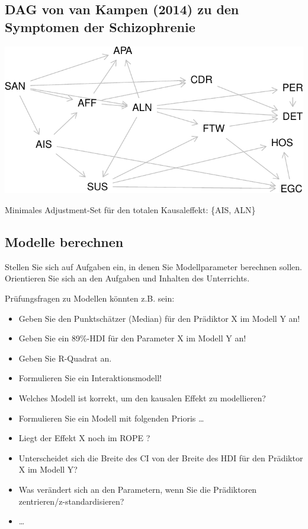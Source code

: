 \documentclass[
  a4paper,
  DIV=11]{scrreprt}
\providecommand{\tightlist}{%
  \setlength{\itemsep}{0pt}\setlength{\parskip}{0pt}}\usepackage{longtable,booktabs,array}
\theoremstyle{definition}
\theoremstyle{remark}
\begin{document}
\hypertarget{dag-von-van-kampen-2014-zu-den-symptomen-der-schizophrenie}{%
\subsection{DAG von van Kampen (2014) zu den Symptomen der
Schizophrenie}\label{dag-von-van-kampen-2014-zu-den-symptomen-der-schizophrenie}}

\includegraphics{./abschluss_files/figure-pdf/dag-van-kampen-1.pdf}

Minimales Adjustment-Set für den totalen Kausaleffekt: \{AIS, ALN\}

\hypertarget{modelle-berechnen}{%
\subsection{Modelle berechnen}\label{modelle-berechnen}}

Stellen Sie sich auf Aufgaben ein, in denen Sie Modellparameter
berechnen sollen. Orientieren Sie sich an den Aufgaben und Inhalten des
Unterrichts.

Prüfungsfragen zu Modellen könnten z.B. sein:

\begin{itemize}
\tightlist
\item
  Geben Sie den Punktschätzer (Median) für den Prädiktor X im Modell Y
  an!
\item
  Geben Sie ein 89\%-HDI für den Parameter X im Modell Y an!
\item
  Geben Sie R-Quadrat an.
\item
  Formulieren Sie ein Interaktionsmodell!
\item
  Welches Modell ist korrekt, um den kausalen Effekt zu modellieren?
\item
  Formulieren Sie ein Modell mit folgenden Prioris \ldots{}
\item
  Liegt der Effekt X noch im ROPE ?
\item
  Unterscheidet sich die Breite des CI von der Breite des HDI für den
  Prädiktor X im Modell Y?
\item
  Was verändert sich an den Parametern, wenn Sie die Prädiktoren
  zentrieren/z-standardisieren?
\item
  \ldots{}
\end{itemize}
\end{document}
